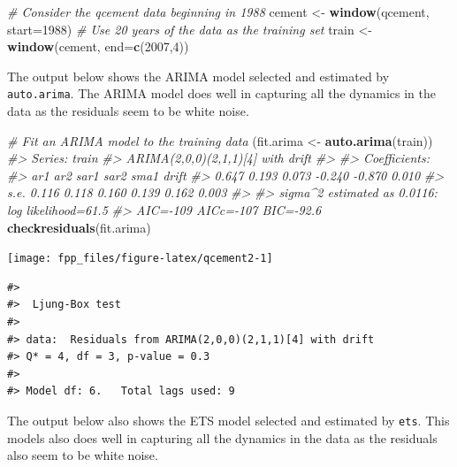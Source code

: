\documentclass[]{book}
\newenvironment{Shaded}{\begin{snugshade}}{\end{snugshade}}
\newcommand{\CommentTok}[1]{\textcolor[rgb]{0.56,0.35,0.01}{\textit{#1}}}
\newcommand{\DataTypeTok}[1]{\textcolor[rgb]{0.13,0.29,0.53}{#1}}
\newcommand{\DecValTok}[1]{\textcolor[rgb]{0.00,0.00,0.81}{#1}}
\newcommand{\KeywordTok}[1]{\textcolor[rgb]{0.13,0.29,0.53}{\textbf{#1}}}
\newcommand{\NormalTok}[1]{#1}
\newcommand{\StringTok}[1]{\textcolor[rgb]{0.31,0.60,0.02}{#1}}
\begin{document}
\begin{Shaded}
\begin{Highlighting}[]
\CommentTok{# Consider the qcement data beginning in 1988}
\NormalTok{cement <-}\StringTok{ }\KeywordTok{window}\NormalTok{(qcement, }\DataTypeTok{start=}\DecValTok{1988}\NormalTok{)}
\CommentTok{# Use 20 years of the data as the training set}
\NormalTok{train <-}\StringTok{ }\KeywordTok{window}\NormalTok{(cement, }\DataTypeTok{end=}\KeywordTok{c}\NormalTok{(}\DecValTok{2007}\NormalTok{,}\DecValTok{4}\NormalTok{))}
\end{Highlighting}
\end{Shaded}

The output below shows the ARIMA model selected and estimated by \texttt{auto.arima}. The ARIMA model does well in capturing all the dynamics in the data as the residuals seem to be white noise.

\begin{Shaded}
\begin{Highlighting}[]
\CommentTok{# Fit an ARIMA model to the training data}
\NormalTok{(fit.arima <-}\StringTok{ }\KeywordTok{auto.arima}\NormalTok{(train))}
\CommentTok{#> Series: train }
\CommentTok{#> ARIMA(2,0,0)(2,1,1)[4] with drift }
\CommentTok{#> }
\CommentTok{#> Coefficients:}
\CommentTok{#>         ar1    ar2   sar1    sar2    sma1  drift}
\CommentTok{#>       0.647  0.193  0.073  -0.240  -0.870  0.010}
\CommentTok{#> s.e.  0.116  0.118  0.160   0.139   0.162  0.003}
\CommentTok{#> }
\CommentTok{#> sigma^2 estimated as 0.0116:  log likelihood=61.5}
\CommentTok{#> AIC=-109   AICc=-107   BIC=-92.6}
\KeywordTok{checkresiduals}\NormalTok{(fit.arima)}
\end{Highlighting}
\end{Shaded}

\begin{center}\texttt{[image: fpp\_files/figure-latex/qcement2-1]} \end{center}

\begin{verbatim}
#> 
#>  Ljung-Box test
#> 
#> data:  Residuals from ARIMA(2,0,0)(2,1,1)[4] with drift
#> Q* = 4, df = 3, p-value = 0.3
#> 
#> Model df: 6.   Total lags used: 9
\end{verbatim}

The output below also shows the ETS model selected and estimated by \texttt{ets}. This models also does well in capturing all the dynamics in the data as the residuals also seem to be white noise.
\end{document}
